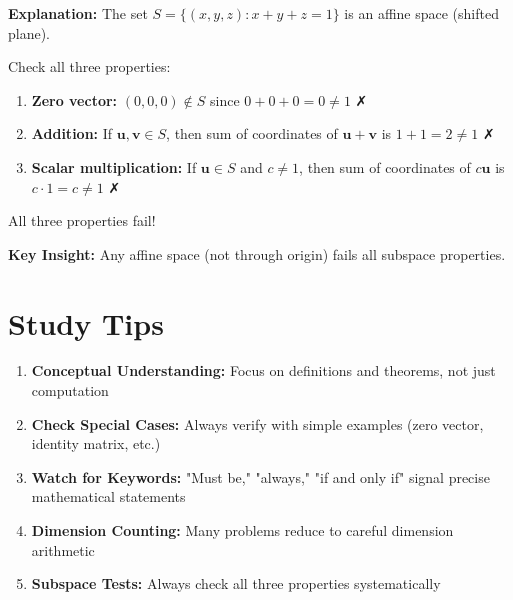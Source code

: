 \documentclass[12pt]{amsart}
\newcommand{\hint}{\textbf{Key Insight: }}
\begin{document}
\textbf{Explanation:} The set $S = \{(x,y,z) : x+y+z = 1\}$ is an affine space (shifted plane).

Check all three properties:
\begin{enumerate}
\item \textbf{Zero vector:} $(0,0,0) \notin S$ since $0+0+0 = 0 \neq 1$ ✗
\item \textbf{Addition:} If $\mathbf{u}, \mathbf{v} \in S$, then sum of coordinates of $\mathbf{u}+\mathbf{v}$ is $1+1 = 2 \neq 1$ ✗
\item \textbf{Scalar multiplication:} If $\mathbf{u} \in S$ and $c \neq 1$, then sum of coordinates of $c\mathbf{u}$ is $c \cdot 1 = c \neq 1$ ✗
\end{enumerate}

All three properties fail!

\hint Any affine space (not through origin) fails all subspace properties.

\hrulefill

\section*{Study Tips}

\begin{enumerate}
\item \textbf{Conceptual Understanding:} Focus on definitions and theorems, not just computation
\item \textbf{Check Special Cases:} Always verify with simple examples (zero vector, identity matrix, etc.)
\item \textbf{Watch for Keywords:} "Must be," "always," "if and only if" signal precise mathematical statements
\item \textbf{Dimension Counting:} Many problems reduce to careful dimension arithmetic
\item \textbf{Subspace Tests:} Always check all three properties systematically
\end{enumerate}
\end{document}
